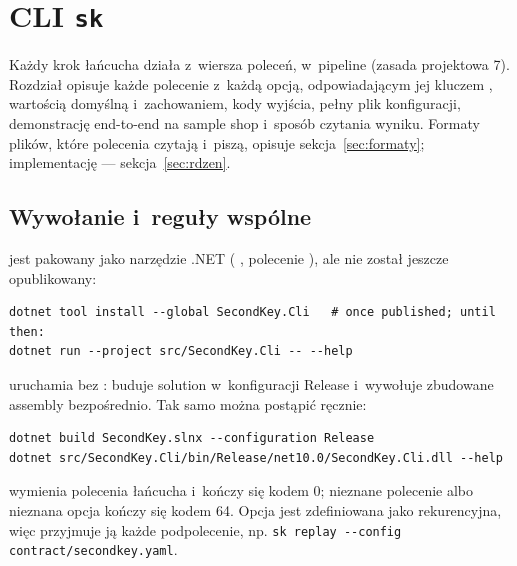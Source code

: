 \section{CLI \texttt{sk}}\label{sec:cli}

Każdy krok łańcucha działa z~wiersza poleceń, w~pipeline (zasada projektowa 7). Rozdział
opisuje każde polecenie  z~każdą opcją, odpowiadającym jej kluczem
, wartością domyślną i~zachowaniem, kody wyjścia, pełny plik
konfiguracji, demonstrację end-to-end na sample shop i~sposób czytania wyniku. Formaty plików,
które polecenia czytają i~piszą, opisuje sekcja~\ref{sec:formaty}; implementację ---
sekcja~\ref{sec:rdzen}.

\subsection{Wywołanie i~reguły wspólne}\label{sec:cli-wywolanie}

 jest pakowany jako narzędzie .NET ( ,
polecenie ), ale nie został jeszcze opublikowany:

\begin{lstlisting}
dotnet tool install --global SecondKey.Cli   # once published; until then:
dotnet run --project src/SecondKey.Cli -- --help
\end{lstlisting}

 uruchamia  bez : buduje solution
w~konfiguracji Release i~wywołuje zbudowane assembly bezpośrednio. Tak samo można postąpić
ręcznie:

\begin{lstlisting}
dotnet build SecondKey.slnx --configuration Release
dotnet src/SecondKey.Cli/bin/Release/net10.0/SecondKey.Cli.dll --help
\end{lstlisting}

 wymienia polecenia łańcucha i~kończy się kodem 0; nieznane polecenie
albo nieznana opcja kończy się kodem 64. Opcja  jest zdefiniowana jako
rekurencyjna, więc przyjmuje ją każde podpolecenie, np.
\texttt{sk replay -{}-config contract/secondkey.yaml}.

